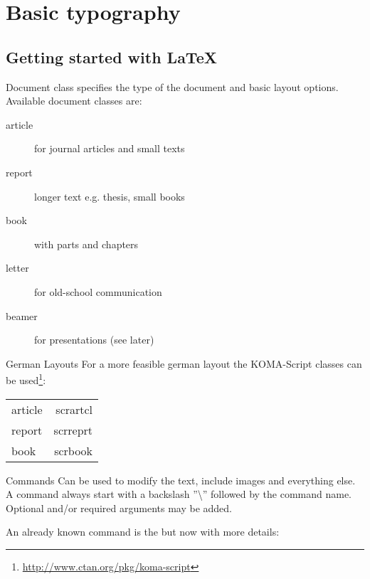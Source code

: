 \section{Basic typography}

\subsection{Getting started with {\LaTeX}}
\begin{frame}
	\begin{block}{Document class}
		 specifies the type of the document and basic
		layout options. Available document classes are:
		\begin{description}
			\item[article] for journal articles and small texts
			\item[report] longer text e.g. thesis, small books
			\item[book] with parts and chapters
			\item[letter] for old-school communication
			\item[beamer] for presentations (see later)
		\end{description}
	\end{block}

	\begin{block}{German Layouts}
		For a more feasible german layout the KOMA-Script classes can be
		used\footnote{\url{http://www.ctan.org/pkg/koma-script}}:
		\begin{center}\begin{tabular}{l@{$\rightarrow$}r}
		article & scrartcl\\
		 report & scrreprt\\
		book & scrbook
		\end{tabular}\end{center}
	\end{block}
\end{frame}
\begin{frame}
	\begin{block}{Commands}
		Can be used to modify the text, include images and everything else.
		A command
		always start with a backslash ''\textbackslash'' followed by the
		command name. Optional and/or required arguments may be added.
	\end{block}
	An already known command is the  but now with more
	details:
\end{frame}
